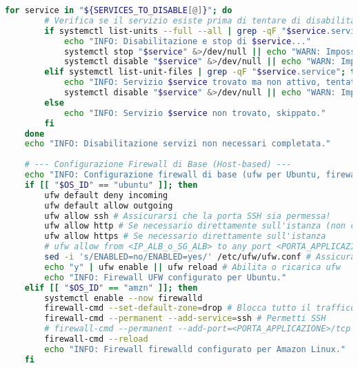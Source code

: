 \begin{lstlisting}[language=Bash, style=bash, caption={Script di Hardening del Sistema Operativo (hardening\_script.sh)}, label={lst:hardening_script_cap2}]
    for service in "${SERVICES_TO_DISABLE[@]}"; do
        # Verifica se il servizio esiste prima di tentare di disabilitarlo
        if systemctl list-units --full --all | grep -qF "$service.service"; then
            echo "INFO: Disabilitazione e stop di $service..."
            systemctl stop "$service" &>/dev/null || echo "WARN: Impossibile stoppare $service (potrebbe essere gia\` stoppato)"
            systemctl disable "$service" &>/dev/null || echo "WARN: Impossibile disabilitare $service (potrebbe non esistere o essere statico)"
        elif systemctl list-unit-files | grep -qF "$service.service"; then # Prova a disabilitare anche se non attivo
            echo "INFO: Servizio $service trovato ma non attivo, tentativo di disabilitazione..."
            systemctl disable "$service" &>/dev/null || echo "WARN: Impossibile disabilitare $service"
        else
            echo "INFO: Servizio $service non trovato, skippato."
        fi
    done
    echo "INFO: Disabilitazione servizi non necessari completata."
    
    # --- Configurazione Firewall di Base (Host-based) ---
    echo "INFO: Configurazione firewall di base (ufw per Ubuntu, firewalld per Amazon Linux)..."
    if [[ "$OS_ID" == "ubuntu" ]]; then
        ufw default deny incoming
        ufw default allow outgoing
        ufw allow ssh # Assicurarsi che la porta SSH sia permessa!
        ufw allow http # Se necessario direttamente sull'istanza (non comune se dietro ALB)
        ufw allow https # Se necessario direttamente sull'istanza
        # ufw allow from <IP_ALB_o_SG_ALB> to any port <PORTA_APPLICAZIONE>
        sed -i 's/ENABLED=no/ENABLED=yes/' /etc/ufw/ufw.conf # Assicura che ufw sia abilitato al boot
        echo "y" | ufw enable || ufw reload # Abilita o ricarica ufw
        echo "INFO: Firewall UFW configurato per Ubuntu."
    elif [[ "$OS_ID" == "amzn" ]]; then
        systemctl enable --now firewalld
        firewall-cmd --set-default-zone=drop # Blocca tutto il traffico in entrata di default
        firewall-cmd --permanent --add-service=ssh # Permetti SSH
        # firewall-cmd --permanent --add-port=<PORTA_APPLICAZIONE>/tcp # Permetti la porta dell'applicazione
        firewall-cmd --reload
        echo "INFO: Firewall firewalld configurato per Amazon Linux."
    fi
    

\end{lstlisting}
